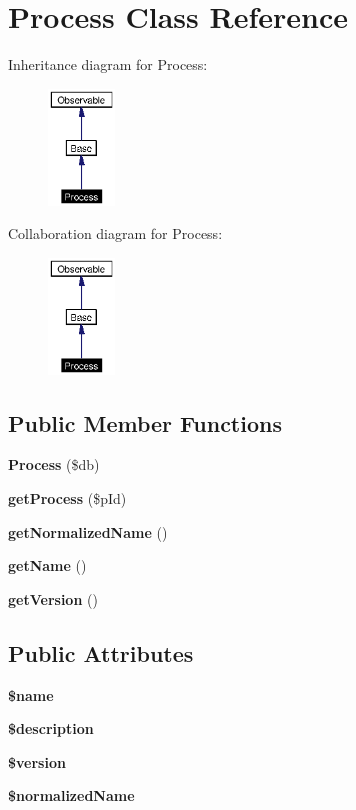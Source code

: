 \section{Process Class Reference}
\label{classProcess}
Inheritance diagram for Process:\begin{figure}[H]
\begin{center}
\leavevmode
\includegraphics[width=50pt]{classProcess__inherit__graph}
\end{center}
\end{figure}
Collaboration diagram for Process:\begin{figure}[H]
\begin{center}
\leavevmode
\includegraphics[width=50pt]{classProcess__coll__graph}
\end{center}
\end{figure}
\subsection*{Public Member Functions}
\begin{CompactItemize}
\item 
{\bf Process} (\$db)\label{classProcess_a0}

\item 
{\bf get\-Process} (\$p\-Id)
\item 
{\bf get\-Normalized\-Name} ()
\item 
{\bf get\-Name} ()
\item 
{\bf get\-Version} ()
\end{CompactItemize}
\subsection*{Public Attributes}
\begin{CompactItemize}
\item 
{\bf \$name}\label{classProcess_o0}

\item 
{\bf \$description}\label{classProcess_o1}

\item 
{\bf \$version}\label{classProcess_o2}

\item 
{\bf \$normalized\-Name}\label{classProcess_o3}

\end{CompactItemize}


